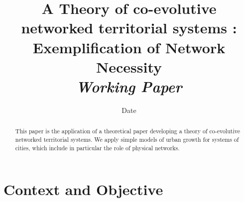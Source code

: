 


\title{A Theory of co-evolutive networked territorial systems : Exemplification of Network Necessity\bigskip\\
\textit{Working Paper}
}
\author{}
\date{Date}


\maketitle

\justify


\begin{abstract}
This paper is the application of a theoretical paper developing a theory of co-evolutive networked territorial systems. We apply simple models of urban growth for systems of cities, which include in particular the role of physical networks.
\end{abstract}



\section{Context and Objective}










